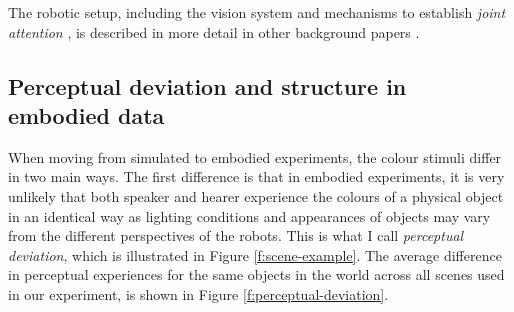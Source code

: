 The robotic setup, including the vision system and mechanisms to
establish \emph{joint attention} \citep{tomasello95jointattention}, is
described in more detail in other background papers
\citep{spranger08diplomathesis, loetzsch10grounding}.

\subsection{Perceptual deviation and structure in embodied data}
\label{s:embodied-data}

When moving from simulated to embodied experiments, the colour stimuli
differ in two main ways. The first difference is that in embodied
experiments, it is very unlikely that both speaker and hearer
experience the colours of a physical object in an identical way as
lighting conditions and appearances of objects may vary from the
different perspectives of the robots. This is what I call
\emph{perceptual deviation}, which is illustrated in Figure
\ref{f:scene-example}. The average difference in perceptual
experiences for the same objects in the world across all scenes used
in our experiment, is shown in Figure \ref{f:perceptual-deviation}.

